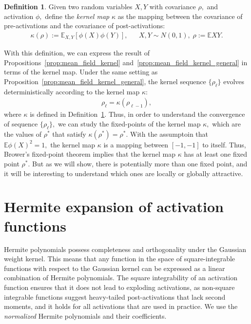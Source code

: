 \documentclass[twoside]{article}
\newcommand{\E}{\mathbb{E}}
\theoremstyle{definition}
\newtheorem{definition}{Definition}
\begin{document}
\begin{definition}
    \label{def:kernel_map}
Given two random variables $X, Y$ with covariance $\rho,$ and activation $\phi,$ define the \emph{kernel map } $\kappa$ as the mapping between the covariance of pre-activations and the covariance of post-activations:
\begin{align}\label{eq:kernel_map}
    \kappa(\rho):=\E_{X,Y}[ \phi(X)\phi(Y)], && X, Y\sim N(0,1),\; \rho:=\E XY.
\end{align}
\end{definition}

With this definition, we can express the result of Propositions~\ref{prop:mean_field_kernel} and~\ref{prop:mean_field_kernel_general} in terms of the kernel map. Under the same setting as Proposition~\ref{prop:mean_field_kernel_general}, the kernel sequence $\{\rho_\ell\}$ evolves deterministically according to the kernel map $\kappa$:
\begin{align}
    \rho_{\ell} = \kappa(\rho_{\ell-1}),
\end{align}
where $\kappa$ is defined in Definition~\ref{def:kernel_map}.  Thus, in order to understand the convergence of sequence $\{\rho_\ell\},$ we can study the fixed-points of the kernel map $\kappa,$
which are the values of $\rho^*$ that satisfy $\kappa(\rho^*) = \rho^*.$ With the assumptoin that $\E \phi(X)^2=1,$ the kernel map $\kappa$ is a mapping between $[-1,-1]$ to itself. Thus, Brower's fixed-point theorem implies that the kernel map $\kappa$ has at least one fixed point $\rho^*.$ But as we will show, there is potentially more than one fixed point, and it will be interesting to understand which ones are locally or globally attractive. 


\section{Hermite expansion of activation functions}
Hermite polynomials possess completeness and orthogonality under the Gaussian weight kernel. This means that any function in the space of square-integrable functions with respect to the Gaussian kernel can be expressed as a linear combination of Hermite polynomials. The square integrability of an activation function ensures that it does not lead to exploding activations, as non-square integrable functions suggest heavy-tailed post-activations that lack second moments, and it holds for all activations that are used in practice. We use the \emph{normalized} Hermite polynomials and their coefficients. 
\end{document}
